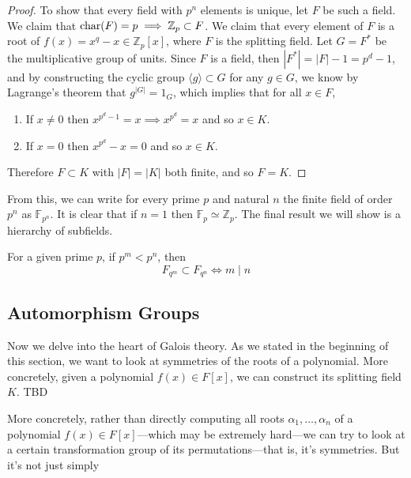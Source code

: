 \begin{proof}
    To show that every field with $p^n$ elements is unique, let $F$ be such a field. We claim that $\Char(F) = p \implies \mathbb{Z}_p \subset F$. We claim that every element of $F$ is a root of $f(x) = x^q - x \in \mathbb{Z}_p [x]$, where $F$ is the splitting field. Let $G = F^\ast$ be the multiplicative group of units. Since $F$ is a field, then $|F^\ast| = |F| - 1 = p^d - 1$, and by constructing the cyclic group $\langle g \rangle \subset G$ for any $g \in G$, we know by Lagrange's theorem that $g^{|G|} = 1_G$, which implies that for all $x \in F$, 
    \begin{enumerate}
      \item If $x \neq 0$ then $x^{p^d - 1} = x \implies x^{p^d} = x$ and so $x \in K$. 
      \item If $x = 0$ then $x^{p^d} - x = 0$ and so $x \in K$. 
    \end{enumerate}
    Therefore $F \subset K$ with $|F| = |K|$ both finite, and so $F = K$. 
  \end{proof} 

  From this, we can write for every prime $p$ and natural $n$ the finite field of order $p^n$ as $\mathbb{F}_{p^n}$. It is clear that if $n = 1$ then $\mathbb{F}_p \simeq \mathbb{Z}_p$. The final result we will show is a hierarchy of subfields. 

  \begin{theorem}
    For a given prime $p$, if $p^m < p^n$, then 
    \begin{equation}
      F_{q^m} \subset F_{q^n} \iff m \mid n
    \end{equation}
  \end{theorem}

\subsection{Automorphism Groups} 

  Now we delve into the heart of Galois theory. As we stated in the beginning of this section, we want to look at symmetries of the roots of a polynomial. More concretely, given a polynomial $f(x) \in F[x]$, we can construct its splitting field $K$. TBD

  More concretely, rather than directly computing all roots $\alpha_1, \ldots, \alpha_n$ of a polynomial $f(x) \in F[x]$---which may be extremely hard---we can try to look at a certain transformation group of its permutations---that is, it's symmetries. But it's not just simply 

